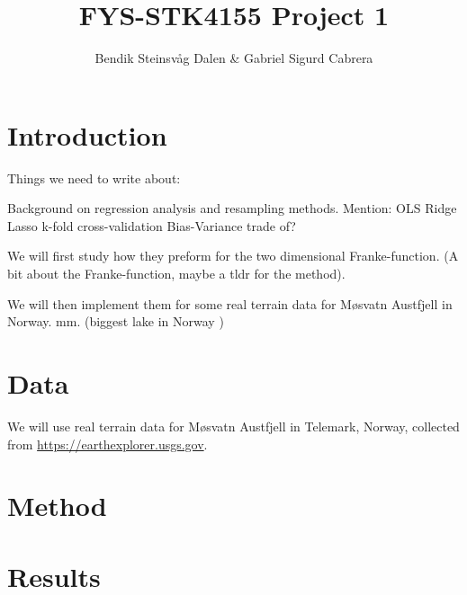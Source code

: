 \documentclass[a4paper,10pt,english]{article}
\begin{document}

\title{FYS-STK4155 Project 1}
\author{Bendik Steinsvåg Dalen \& Gabriel Sigurd Cabrera}
\maketitle

\begin{abstract}

\end{abstract}

\section{Introduction}
\label{sec:introduction}

Things we need to write about:

Background on regression analysis and resampling methods.
Mention:
	OLS
	Ridge
	Lasso
	k-fold cross-validation
	Bias-Variance trade of?

We will first study how they preform for the two dimensional Franke-function. (A bit about the Franke-function, maybe a tldr for the method).

We will then implement them for some real terrain data for Møsvatn Austfjell in Norway. mm. (biggest lake in Norway ) %




\section{Data}
\label{sec:data}

We will use real terrain data for Møsvatn Austfjell in Telemark, Norway, collected from \url{https://earthexplorer.usgs.gov}. 

\section{Method}
\label{sec:method}

\section{Results}
\label{sec:results}

\end{document}
